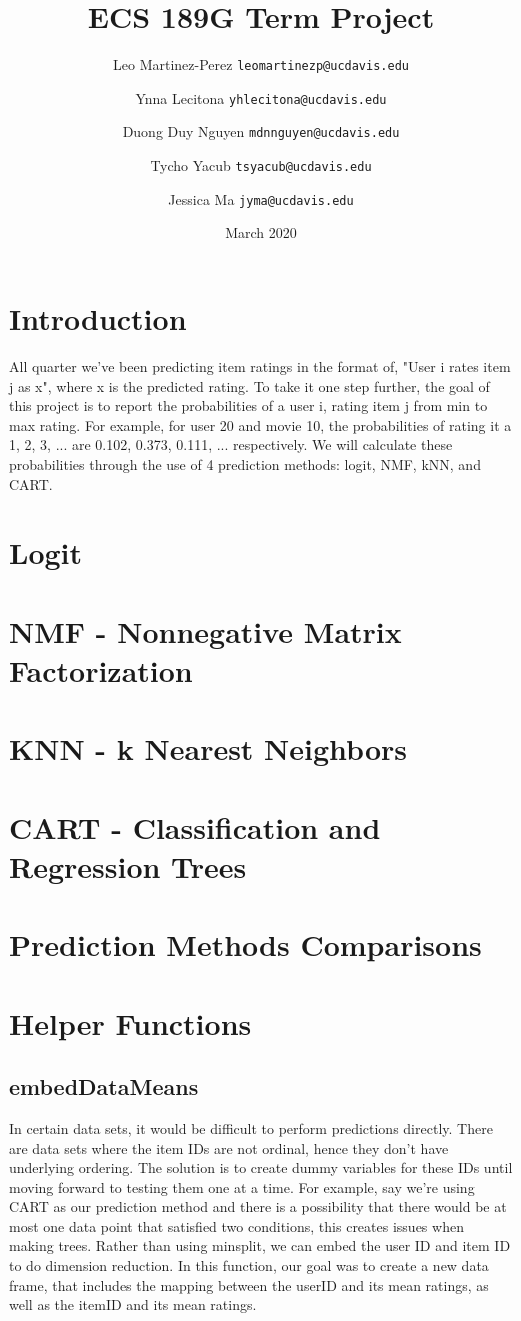 \documentclass{article}
\title{ECS 189G Term Project}
\author{Leo Martinez-Perez
    \texttt{leomartinezp@ucdavis.edu}
    \and Ynna Lecitona
    \texttt{yhlecitona@ucdavis.edu}
    \and Duong Duy Nguyen
    \texttt{mdnnguyen@ucdavis.edu}
    \and Tycho Yacub
    \texttt{tsyacub@ucdavis.edu}
    \and Jessica Ma
    \texttt{jyma@ucdavis.edu}
}
\date{March 2020}
\begin{document}
\maketitle

\section{Introduction}
All quarter we've been predicting item ratings in the format of, "User i rates item j as x", where x is the predicted rating. To take it one step further, the goal of this project is to report the probabilities of a user i, rating item j from min to max rating. For example, for user 20 and movie 10, the probabilities of rating it a 1, 2, 3, ... are 0.102, 0.373, 0.111, ... respectively. We will calculate these probabilities through the use of 4 prediction methods: logit, NMF, kNN, and CART.

\section{Logit}

\section{NMF - Nonnegative Matrix Factorization}

\section{KNN - k Nearest Neighbors}

\section{CART - Classification and Regression Trees}

\section{Prediction Methods Comparisons}

\section{Helper Functions}
\subsection{embedDataMeans}
In certain data sets, it would be difficult to perform predictions directly. There are data sets where the item IDs are not ordinal, hence they don't have underlying ordering. The solution is to create dummy variables for these IDs until moving forward to testing them one at a time.
For example, say we're using CART as our prediction method and there is a possibility that there would be at most one data point that satisfied two conditions, this creates issues when making trees. Rather than using minsplit, we can embed the user ID and item ID to do dimension reduction. In this function, our goal was to create a new data frame, that includes the mapping between the userID and its mean ratings, as well as the itemID and its mean ratings.
\end{document}
